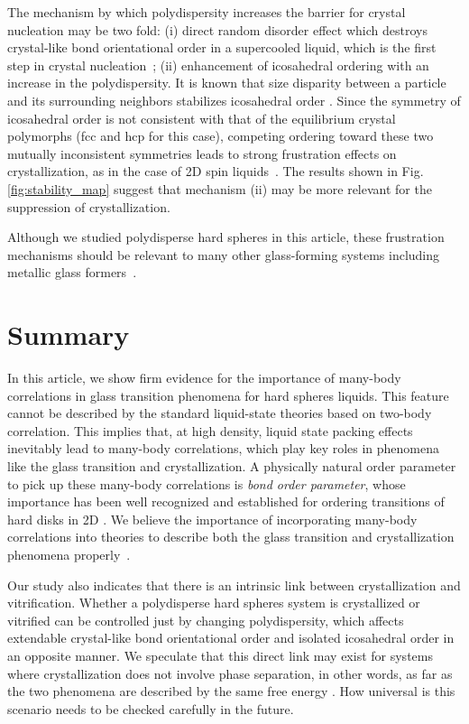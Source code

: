 \documentclass[twocolumn,superscriptaddress]{revtex4}
\begin{document}
The mechanism by which polydispersity increases the barrier for crystal nucleation may be two fold: 
(i) direct random disorder effect which destroys crystal-like bond orientational order in a supercooled liquid,
which is the first step in crystal nucleation~\cite{russo_hs};
(ii) enhancement of icosahedral ordering with an increase in the polydispersity.
It is known that size disparity between a particle and its surrounding neighbors stabilizes icosahedral order \cite{Shimono2012}. 
Since the symmetry of icosahedral order is not consistent with that of the equilibrium crystal polymorphs (fcc and hcp for this case), 
competing ordering toward these two mutually inconsistent symmetries leads to strong frustration effects on crystallization, as in the case of 
2D spin liquids~\cite{ShintaniNP,STNM}. 
The results shown in Fig. \ref{fig:stability_map} suggest that mechanism (ii) may be more relevant for the suppression of crystallization. 

Although we studied polydisperse hard spheres in this article, these frustration mechanisms should be relevant to many other 
glass-forming systems including metallic glass formers~\cite{Jakse2008,Hwang2012}. 

\section{Summary}


In this article, we show firm evidence for the importance of many-body correlations in glass transition phenomena 
for hard spheres liquids. This feature cannot be described by the standard liquid-state theories based on two-body correlation. 
This implies that, at high density, liquid state packing effects inevitably lead to many-body correlations, which play 
key roles in phenomena like the glass transition and crystallization. 
A physically natural order parameter to pick up these many-body correlations is \emph{bond order parameter}, whose importance 
has been well recognized and established for ordering transitions of hard disks in 2D \cite{NelsonB}. 
We believe the importance of incorporating many-body correlations into theories to describe
both the glass transition and crystallization phenomena properly~\cite{TanakaJSP,TanakaR}.

Our study also indicates that there is an intrinsic link between crystallization and vitrification. 
Whether a polydisperse hard spheres system is crystallized or vitrified can be controlled just by changing 
polydispersity, which affects extendable crystal-like bond orientational order and isolated icosahedral order 
in an opposite manner.
We speculate that this direct link may exist for systems where crystallization does not involve phase separation, 
in other words, as far as the two phenomena are described by the same free energy \cite{TanakaGJPCM,TanakaJSP,TanakaR}.  
How universal is this scenario needs to be checked carefully in the future. 
\end{document}
